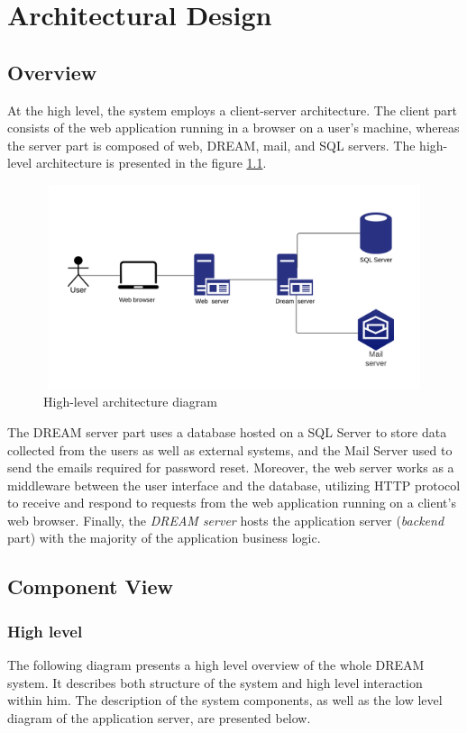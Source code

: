 \chapter{Architectural Design} \label{ch:architectural_design}


\section{Overview}
 At the high level, the system employs a client-server architecture. The client part consists of the web application running in a browser on a user's machine, whereas the server part is composed of web, DREAM, mail, and SQL servers. The high-level architecture is presented in the figure \ref{fig:high-level-architecture}.

\begin{figure}[H]
    \centering
    \includegraphics[width=12cm, height=6cm]
    {figures/Overview.png}
    \caption{High-level architecture diagram}
    \label{fig:high-level-architecture}
\end{figure}

The DREAM server part uses a database hosted on a SQL Server to store data collected from the users as well as external systems, and the Mail Server used to send the emails required for password reset. Moreover, the web server works as a middleware between the user interface and the database, utilizing HTTP protocol to receive and respond to requests from the web application running on a client's web browser. Finally, the \textit{DREAM server} hosts the application server (\textit{backend} part) with the majority of the application business logic. 

\section{Component View}

\subsection{High level}
The following diagram presents a high level overview of the whole DREAM system. It describes both structure of the system and high level interaction within him. The description of the system components, as well as the low level diagram of the application server, are presented below.

